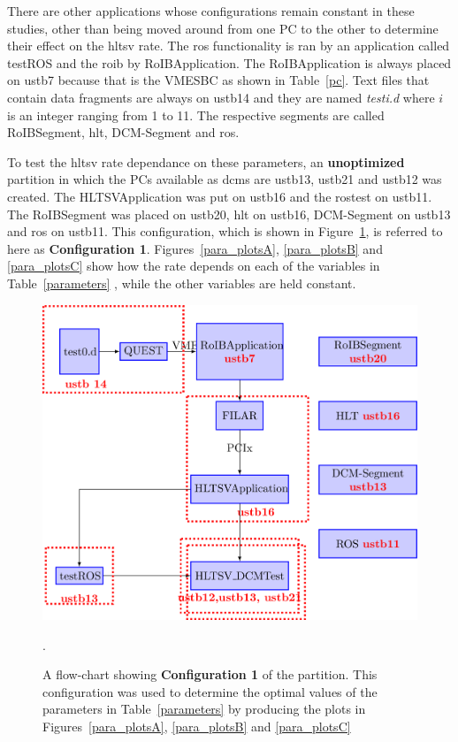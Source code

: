 \par There are other applications whose configurations remain constant 
in these studies, other than being moved around from one PC to the other to determine 
their effect on the \acrshort{hltsv} rate. The \acrshort{ros} functionality is ran 
by an application called testROS and the \acrshort{roib} by RoIBApplication. The RoIBApplication 
is always placed on ustb7 because that is the VMESBC as shown in Table~\ref{pc}. Text 
files that contain data fragments are always on ustb14 and they are named {\it testi.d} 
where $i$ is an integer ranging from 1 to 11. The respective segments are called RoIBSegment, 
\acrshort{hlt}, DCM-Segment and \acrshort{ros}.  

\par To test the \acrshort{hltsv} rate dependance on these parameters, 
an {\bf unoptimized} partition in which the PCs available as \acrshort{dcm}s 
are ustb13, ustb21 and ustb12 was created.  The HLTSVApplication was put on ustb16 and the
 \gls{rostest} on ustb11. The RoIBSegment was placed on ustb20, \acrshort{hlt} on ustb16, 
DCM-Segment on ustb13 and \acrshort{ros} on ustb11. This  
configuration, which is shown in Figure~\ref{conf1}, is referred to here as {\bf Configuration 1}.
Figures~\ref{para_plotsA}, \ref{para_plotsB} and \ref{para_plotsC} show how the rate 
depends on each of the variables in Table~\ref{parameters} , while the other variables are held constant.

\begin{figure}[!h]
\centering
\includegraphics[width=0.8\linewidth]{figures/confOne.png}
\caption{A flow-chart showing {\bf Configuration 1} of the partition. This configuration was used to determine 
the optimal values of the parameters in Table~\ref{parameters} by producing the 
plots in Figures~\ref{para_plotsA}, \ref{para_plotsB} and \ref{para_plotsC}}.
\label{conf1}
\end{figure}

